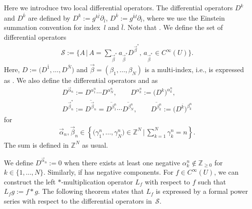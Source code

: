 \documentclass[pdftex]{sigma}
\numberwithin{equation}{section}
\begin{document}
Here we introduce two local differential operators. The differential operators
$
 D^{k}
$
and
$
 D^{\overline{k}}
$
are defined by
$
 D^{k}
 :=
 g^{k\overline{l}}
 \partial_{\overline{l}}$,
$
 D^{\overline{k}}
 :=
 g^{\overline{k}l}
 \partial_{l}$,
where we use the Einstein summation convention for index~$l$ and $\bar{l}$.
Note that .
We define the set of differential operators
\begin{align*}
 {\mathcal S}
 :=
 \bigg\{
 A \,
 \bigg|\,
 A
 =
 \sum_{\vec{\beta}^{\ast}}
 a_{\vec{\beta}^{\ast}}
 D^{\vec{\beta}^{\ast}},\,
 a_{\vec{\beta}^{\ast}}
 \in
 C^{\infty}
 (U)
 \bigg\}.
\end{align*}
Here,
$
D
:=
 \bigl(
D^{\bar{1}},
\dots,
D^{\bar{N}}
 \bigr)
$
and
$
 \vec{\beta}
 =
 (
 \beta_{1},
 \dots,
 \beta_{N}
 )
$ is a multi-index, i.e.,  is expressed as
.
We also define the differential operators
and
as
\begin{gather*}
 D^{\vec{\alpha}_{n}}
 :=
 D^{\alpha_{1}^{n}}\cdots D^{\alpha_{N}^{n}},
 \qquad
 D^{\alpha_{k}^{n}}
 :=
 \bigl(
 D^{k}
 \bigr)^{\alpha_{k}^{n}},
 \\
 D^{\vec{\beta}_{n}^{\ast}}
 :=
 \overline{
 D^{\vec{\beta}_{n}}
 }
 =
 \overline{D^{\beta_{1}^{n}}}
 \cdots
 \overline{D^{\beta_{N}^{n}}},
 \qquad
 \overline{D^{\beta_{k}^{n}}}
 :=
 \bigl(
 D^{\overline{k}}
 \bigr)^{\beta_{k}^{n}}
\end{gather*}
for
\begin{align*}
 \vec{\alpha}_{n},
 \vec{\beta}_{n}
 \in
 \left\{
 \bigl(\gamma_{1}^{n},\dots,\gamma_{N}^{n} \bigr)
 \in
 \mathbb{Z}^{N}
 \,\bigg|\,
 \sum_{k=1}^{N}
 \gamma_{k}^{n}
 =
 n
 \right\}.
\end{align*}
The sum
 is defined in $\mathbb{Z}^{N} $ as usual.

We define
$ D^{\vec{\alpha}_{n}}:=0$
when there exists at least one negative
$ \alpha_{k}^{n}
 \notin\mathbb{Z}_{\geq0}$
for
$
 k
 \in
\{1,\dots,N\}
$.
Similarly,
if  has negative components.
For
$
 f
 \in
 C^{\infty}
 (U)
$,
we can construct the left $\ast$-multiplication operator $L_{f} $ with respect to $f$
such that
$ L_{f} g := f \ast g $. The following theorem states that $L_{f}$ is expressed by a formal power series with respect to the differential operators in~$\mathcal{S}$.
\end{document}

